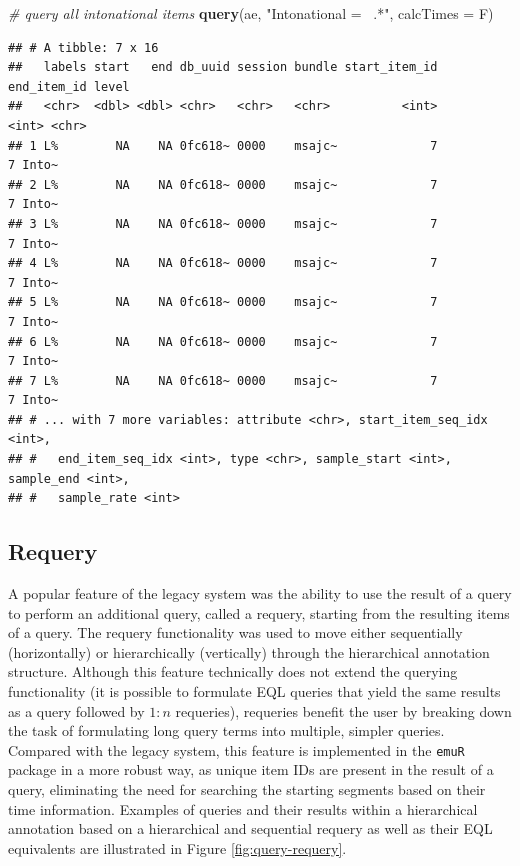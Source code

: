 \documentclass[]{book}
\newenvironment{Shaded}{\begin{snugshade}}{\end{snugshade}}
\newcommand{\CommentTok}[1]{\textcolor[rgb]{0.56,0.35,0.01}{\textit{#1}}}
\newcommand{\DataTypeTok}[1]{\textcolor[rgb]{0.13,0.29,0.53}{#1}}
\newcommand{\KeywordTok}[1]{\textcolor[rgb]{0.13,0.29,0.53}{\textbf{#1}}}
\newcommand{\NormalTok}[1]{#1}
\newcommand{\StringTok}[1]{\textcolor[rgb]{0.31,0.60,0.02}{#1}}
\begin{document}
\begin{Shaded}
\begin{Highlighting}[]
\CommentTok{# query all intonational items}
\KeywordTok{query}\NormalTok{(ae, }\StringTok{"Intonational =~ .*"}\NormalTok{, }\DataTypeTok{calcTimes =}\NormalTok{ F)}
\end{Highlighting}
\end{Shaded}

\begin{verbatim}
## # A tibble: 7 x 16
##   labels start   end db_uuid session bundle start_item_id end_item_id level
##   <chr>  <dbl> <dbl> <chr>   <chr>   <chr>          <int>       <int> <chr>
## 1 L%        NA    NA 0fc618~ 0000    msajc~             7           7 Into~
## 2 L%        NA    NA 0fc618~ 0000    msajc~             7           7 Into~
## 3 L%        NA    NA 0fc618~ 0000    msajc~             7           7 Into~
## 4 L%        NA    NA 0fc618~ 0000    msajc~             7           7 Into~
## 5 L%        NA    NA 0fc618~ 0000    msajc~             7           7 Into~
## 6 L%        NA    NA 0fc618~ 0000    msajc~             7           7 Into~
## 7 L%        NA    NA 0fc618~ 0000    msajc~             7           7 Into~
## # ... with 7 more variables: attribute <chr>, start_item_seq_idx <int>,
## #   end_item_seq_idx <int>, type <chr>, sample_start <int>, sample_end <int>,
## #   sample_rate <int>
\end{verbatim}

\hypertarget{subsec:requery}{%
\subsection{Requery}\label{subsec:requery}}

A popular feature of the legacy system was the ability to use the result of a query to perform an additional query, called a requery, starting from the resulting items of a query. The requery functionality was used to move either sequentially (horizontally) or hierarchically (vertically) through the hierarchical annotation structure. Although this feature technically does not extend the querying functionality (it is possible to formulate EQL queries that yield the same results as a query followed by \(1:n\) requeries), requeries benefit the user by breaking down the task of formulating long query terms into multiple, simpler queries. Compared with the legacy system, this feature is implemented in the \texttt{emuR} package in a more robust way, as unique item IDs are present in the result of a query, eliminating the need for searching the starting segments based on their time information. Examples of queries and their results within a hierarchical annotation based on a hierarchical and sequential requery as well as their EQL equivalents are illustrated in Figure \ref{fig:query-requery}.
\end{document}

